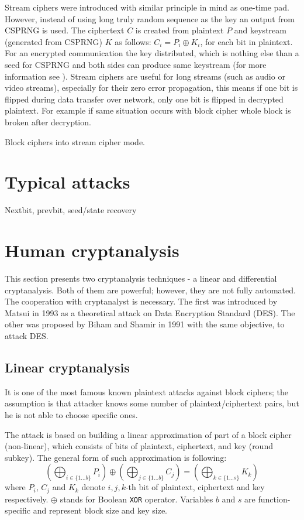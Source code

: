 \documentclass[
    digital,    %
    oneside,    %
    color,
    11pt,
    nocover,
    notable,
    nolof,
    nolot,
    final
]{fithesis3}
\renewcommand\_{\textunderscore\allowbreak}
\begin{document}
Stream ciphers were introduced with similar principle in mind as one-time pad. However, instead of using long truly random sequence as the key an output from CSPRNG is used. The ciphertext $C$ is created from plaintext $P$ and keystream (generated from CSPRNG) $K$ as follows: $C_{i} = P_{i} \oplus K_{i}$, for each bit in plaintext. For an encrypted communication the key distributed, which is nothing else than a seed for CSPRNG and both sides can produce same keystream (for more information see \cite{schneier1996applied}). Stream ciphers are useful for long streams (such as audio or video streams), especially for their zero error propagation, this means if one bit is flipped during data transfer over network, only one bit is flipped in decrypted plaintext. For example if same situation occurs with block cipher whole block is broken after decryption.


Block ciphers into stream cipher mode.

\section{Typical attacks}
Nextbit, prevbit, seed/state recovery

\section{Human cryptanalysis}

This section presents two cryptanalysis techniques - a linear and differential cryptanalysis. Both of them are powerful; however, they are not fully automated. The cooperation with cryptanalyst is necessary. The first was introduced by Matsui \cite{matsui1993linear} in 1993 as a theoretical attack on Data Encryption Standard (DES). The other was proposed by Biham and Shamir \cite{Biham1991} in 1991 with the same objective, to attack DES.


\subsection{Linear cryptanalysis}

It is one of the most famous known plaintext attacks against block ciphers; the assumption is that attacker knows some number of plaintext/ciphertext pairs, but he is not able to choose specific ones. 

The attack is based on building a linear approximation of part of a block cipher (non-linear), which consists of bits of plaintext, ciphertext, and key (round subkey). The general form of such approximation is following: 
\begin{equation}
\left( \bigoplus_{i \in \{1...b\}} P_{i} \right) \oplus \left( \bigoplus_{j \in \{1...b\}} C_{j} \right) = \left( \bigoplus_{k \in \{1...s\}} K_{k} \right)
\label{eq:general_approx}
\end{equation}
where $P_{i}$, $C_{j}$ and $K_{k}$ denote $i,j,k$-th bit of plaintext, ciphertext and key respectively. $\oplus$ stands for Boolean \texttt{XOR} operator. Variables $b$ and $s$ are function-specific and represent block size and key size. \cite{junod2000linear} 
\end{document}
